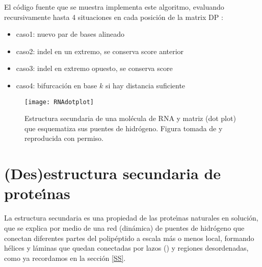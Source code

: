 El c\'{o}digo fuente que se muestra implementa este algoritmo, 
evaluando recursivamente hasta 4 situaciones en cada posici\'{o}n de la matrix DP \citep{Eddy2004b}:
\begin{itemize}
\item caso1: nuevo par de bases alineado
\item caso2: indel en un extremo, se conserva score anterior
\item caso3: indel en extremo opuesto, se conserva score
\item caso4: bifurcaci\'{o}n en base $k$ si hay distancia suficiente 
\end{itemize}




\begin{figure}
\begin{center} 
\texttt{[image: RNAdotplot]}
\caption
{
Estructura secundaria de una mol\'{e}cula de RNA y matriz (dot plot) que esquematiza sus puentes de hidr\'{o}geno.
Figura tomada de \cite{Bernhart2006} y reproducida con permiso. 
}
\label{fig:RNAdotplot}
\end{center}
\end{figure}
\section{(Des)estructura secundaria de prote\'\i{}nas} \label{protSS}

La estructura secundaria es una propiedad de las prote\'\i{}nas naturales en soluci\'{o}n, 
que se explica por medio de una red (din\'{a}mica) de puentes de hidr\'{o}geno que conectan diferentes partes del polip\'{e}ptido 
a escala m\'{a}s o menos local, formando h\'{e}lices y l\'{a}minas que quedan conectadas por lazos () y regiones 
desordenadas, como ya recordamos en la secci\'{o}n \ref{SS}. 

